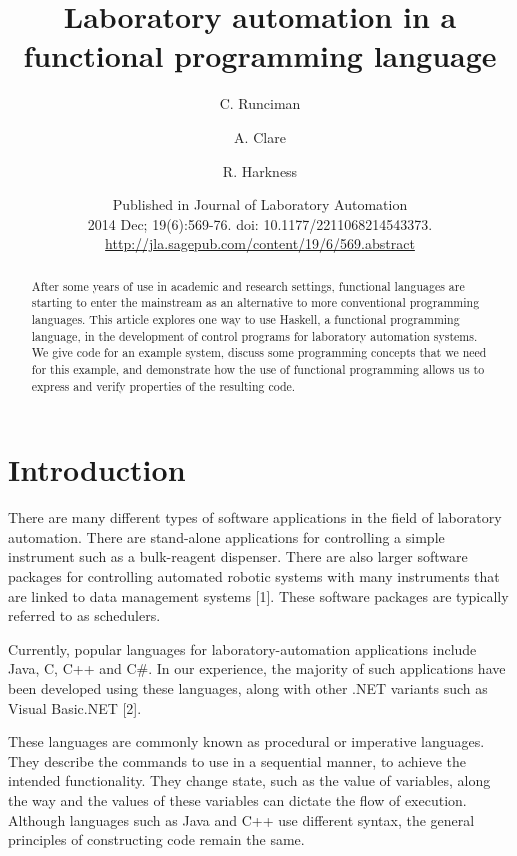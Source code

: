 \documentclass{article}
\title{Laboratory automation in a functional programming language}
\author{C. Runciman \and A. Clare \and R. Harkness}
\date{Published in Journal of Laboratory Automation\\2014 Dec; 19(6):569-76. doi: 10.1177/2211068214543373.\\ \url{http://jla.sagepub.com/content/19/6/569.abstract}}
\begin{document}
\maketitle


\begin{abstract}
After some years of use in academic and research settings, functional languages are starting to enter the mainstream as an alternative to more conventional programming languages. This article explores one way to use Haskell, a functional programming language, in the development of control programs for laboratory automation systems. We give code for an example system, discuss some programming concepts that we need for this example, and demonstrate how the use of functional programming allows us to express and verify properties of the resulting code.
\end{abstract}

\section{Introduction}

There are many different types of software applications in the field of laboratory automation.  There are stand-alone applications for controlling a simple instrument such as a bulk-reagent dispenser. There are also larger software packages for controlling automated robotic systems with many instruments that are linked to data management systems [1]. These software packages are typically referred to as schedulers.

Currently, popular languages for laboratory-automation applications include Java, C, C++ and C\#. In our experience, the majority of such applications have been developed using these languages, along with other .NET variants such as Visual Basic.NET [2].  

These languages are commonly known as procedural or imperative languages. They describe the commands to use in a sequential manner, to achieve the intended functionality. They change state, such as the value of variables, along the way and the values of these variables can dictate the flow of execution.  Although languages such as Java and C++ use different syntax, the general principles of constructing code remain the same.
\end{document}

